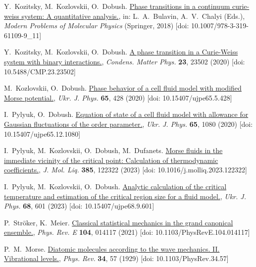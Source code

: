 \begin{thebibliography}{9}
	 Y.~Kozitsky, M.~Kozlovskii, O.~Dobush.
	\href{https://link.springer.com/chapter/10.1007/978-3-319-61109-9_11}{Phase transitions in a continuum curie-weiss system: A quantitative analysis.}, in: L.~A.~Bulavin, A.~V.~Chalyi (Eds.), \textit{Modern Problems of Molecular Physics} (Springer, 2018) [doi: 10.1007/978-3-319-61109-9\_11]
		
	 Y.~Kozitsky, M.~Kozlovskii, O.~Dobush.
	\href{https://icmp.lviv.ua/journal/zbirnyk.102/23502/abstract.html}{A phase transition in a Curie-Weiss system with binary interactions.}, \textit{Condens.
	Matter Phys.} \textbf{23}, 23502 (2020) [doi: 10.5488/CMP.23.23502]
	
	 M.~Kozlovskii, O.~Dobush.
	\href{https://ujp.bitp.kiev.ua/index.php/ujp/article/view/2019631}{Phase
	behavior of a cell fluid model with modified Morse potential.}, \textit{Ukr. J. Phys.} \textbf{65}, 428 (2020) [doi: 10.15407/ujpe65.5.428]
	
	 I.~Pylyuk, O.~Dobush. \href{https://ujp.bitp.kiev.ua/index.php/ujp/article/view/2020185}{Equation of state of a cell fluid model with allowance for Gaussian fluctuations of the order parameter.}, \textit{Ukr. J. Phys.} \textbf{65}, 1080 (2020) [doi: 10.15407/ujpe65.12.1080]
	
		I.~Pylyuk, M.~Kozlovskii, O.~Dobush, M.~Dufanets.
	\href{https://www.sciencedirect.com/science/article/pii/S0167732223011261}{Morse fluids in the immediate vicinity of the critical point: Calculation of thermodynamic coefficients.}, \textit{J. Mol. Liq.} \textbf{385}, 122322 (2023) [doi: 10.1016/j.molliq.2023.122322]
	
	 I.~Pylyuk, M.~Kozlovskii, O.~Dobush.
	\href{https://ujp.bitp.kiev.ua/index.php/ujp/article/view/2023197}{Analytic calculation of the critical temperature and estimation of the critical region size for a fluid model.}, \textit{Ukr. J. Phys.} \textbf{68}, 601 (2023) [doi: 10.15407/ujpe68.9.601]
	
	 P.~Str\"oker, K.~Meier.
	\href{https://link.aps.org/doi/10.1103/PhysRevE.104.014117}{Classical
	statistical mechanics in the grand canonical ensemble.}, \textit{Phys. Rev. E} \textbf{104}, 014117 (2021) [doi: 10.1103/PhysRevE.104.014117]
	
		P.~M.~Morse. \href{https://link.aps.org/doi/10.1103/PhysRev.34.57}{Diatomic
	molecules according to the wave mechanics. II. Vibrational levels.}, \textit{Phys.
	Rev.} \textbf{34}, 57 (1929) [doi: 10.1103/PhysRev.34.57]
	

\end{thebibliography}
